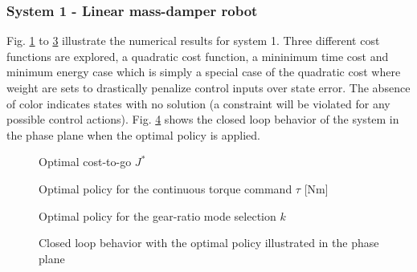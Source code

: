 \subsubsection{System 1 - Linear mass-damper robot}
Fig. \ref{fig:J} to \ref{fig:u1} illustrate the numerical results for system 1. Three different cost functions are explored, a quadratic cost function, a mininimum time cost and minimum energy case which is simply a special case of the quadratic cost where weight are sets to drastically penalize control inputs over state error. The absence of color indicates states with no solution (a constraint will be violated for any possible control actions). Fig. \ref{fig:phase_plane} shows the closed loop behavior of the system in the phase plane when the optimal policy is applied.
%
\begin{figure}[p]
				\vspace{-2pt}
        \centering
        \caption{Optimal cost-to-go $J^*$}\label{fig:J}
\end{figure}
%
\begin{figure}[p]
				\vspace{-2pt}
        \centering
        \caption{Optimal policy for the continuous torque command $\tau$ [Nm]}\label{fig:u0}
\end{figure}
%
\begin{figure}[p]
				\vspace{-2pt}
        \centering
        \caption{Optimal policy for the gear-ratio mode selection $k$}\label{fig:u1}
\end{figure}
%
\begin{figure}[p]
				\vspace{-2pt}
        \centering
        \caption[Closed loop behavior in the phase plane]{Closed loop behavior with the optimal policy illustrated in the phase plane}\label{fig:phase_plane}
\end{figure}

